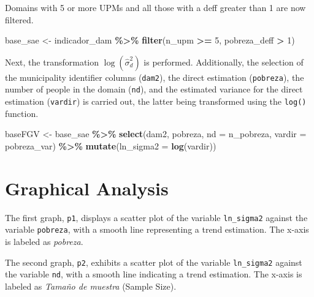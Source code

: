 \documentclass[
  12pt,
]{book}
\newenvironment{Shaded}{\begin{snugshade}}{\end{snugshade}}
\newcommand{\AttributeTok}[1]{\textcolor[rgb]{0.13,0.29,0.53}{#1}}
\newcommand{\DecValTok}[1]{\textcolor[rgb]{0.00,0.00,0.81}{#1}}
\newcommand{\FunctionTok}[1]{\textcolor[rgb]{0.13,0.29,0.53}{\textbf{#1}}}
\newcommand{\NormalTok}[1]{#1}
\newcommand{\OtherTok}[1]{\textcolor[rgb]{0.56,0.35,0.01}{#1}}
\newcommand{\SpecialCharTok}[1]{\textcolor[rgb]{0.81,0.36,0.00}{\textbf{#1}}}
\begin{document}
Domains with 5 or more UPMs and all those with a deff greater than 1 are now filtered.

\begin{Shaded}
\begin{Highlighting}[]
\NormalTok{base\_sae }\OtherTok{\textless{}{-}}\NormalTok{ indicador\_dam }\SpecialCharTok{\%\textgreater{}\%}
  \FunctionTok{filter}\NormalTok{(n\_upm }\SpecialCharTok{\textgreater{}=} \DecValTok{5}\NormalTok{,}
\NormalTok{         pobreza\_deff }\SpecialCharTok{\textgreater{}} \DecValTok{1}\NormalTok{) }
\end{Highlighting}
\end{Shaded}

Next, the transformation \(\log(\hat{\sigma}^2_d)\) is performed. Additionally, the selection of the municipality identifier columns (\texttt{dam2}), the direct estimation (\texttt{pobreza}), the number of people in the domain (\texttt{nd}), and the estimated variance for the direct estimation (\texttt{vardir}) is carried out, the latter being transformed using the \texttt{log()} function.

\begin{Shaded}
\begin{Highlighting}[]
\NormalTok{baseFGV }\OtherTok{\textless{}{-}}\NormalTok{  base\_sae }\SpecialCharTok{\%\textgreater{}\%} 
  \FunctionTok{select}\NormalTok{(dam2, pobreza, }\AttributeTok{nd =}\NormalTok{ n\_pobreza, }\AttributeTok{vardir =}\NormalTok{ pobreza\_var) }\SpecialCharTok{\%\textgreater{}\%}
  \FunctionTok{mutate}\NormalTok{(}\AttributeTok{ln\_sigma2 =} \FunctionTok{log}\NormalTok{(vardir))}
\end{Highlighting}
\end{Shaded}

\hypertarget{graphical-analysis}{%
\section{Graphical Analysis}\label{graphical-analysis}}

The first graph, \texttt{p1}, displays a scatter plot of the variable \texttt{ln\_sigma2} against the variable \texttt{pobreza}, with a smooth line representing a trend estimation. The x-axis is labeled as \emph{pobreza}.

The second graph, \texttt{p2}, exhibits a scatter plot of the variable \texttt{ln\_sigma2} against the variable \texttt{nd}, with a smooth line indicating a trend estimation. The x-axis is labeled as \emph{Tamaño de muestra} (Sample Size).
\end{document}
